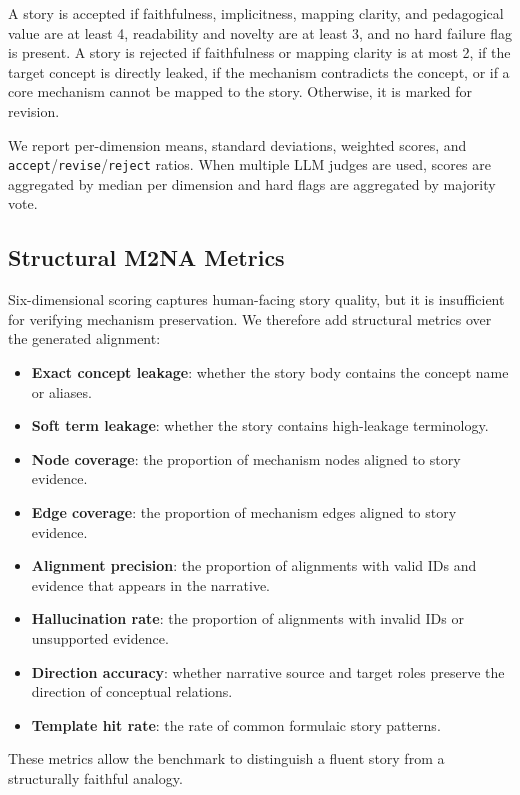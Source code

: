 \documentclass[letterpaper]{article} %
\begin{document}
A story is accepted if faithfulness, implicitness, mapping clarity, and pedagogical value are at least 4, readability and novelty are at least 3, and no hard failure flag is present. A story is rejected if faithfulness or mapping clarity is at most 2, if the target concept is directly leaked, if the mechanism contradicts the concept, or if a core mechanism cannot be mapped to the story. Otherwise, it is marked for revision.

We report per-dimension means, standard deviations, weighted scores, and \texttt{accept}/\texttt{revise}/\texttt{reject} ratios. When multiple LLM judges are used, scores are aggregated by median per dimension and hard flags are aggregated by majority vote.

\subsection{Structural M2NA Metrics}

Six-dimensional scoring captures human-facing story quality, but it is insufficient for verifying mechanism preservation. We therefore add structural metrics over the generated alignment:
\begin{itemize}
\item \textbf{Exact concept leakage}: whether the story body contains the concept name or aliases.
\item \textbf{Soft term leakage}: whether the story contains high-leakage terminology.
\item \textbf{Node coverage}: the proportion of mechanism nodes aligned to story evidence.
\item \textbf{Edge coverage}: the proportion of mechanism edges aligned to story evidence.
\item \textbf{Alignment precision}: the proportion of alignments with valid IDs and evidence that appears in the narrative.
\item \textbf{Hallucination rate}: the proportion of alignments with invalid IDs or unsupported evidence.
\item \textbf{Direction accuracy}: whether narrative source and target roles preserve the direction of conceptual relations.
\item \textbf{Template hit rate}: the rate of common formulaic story patterns.
\end{itemize}

These metrics allow the benchmark to distinguish a fluent story from a structurally faithful analogy.
\end{document}
